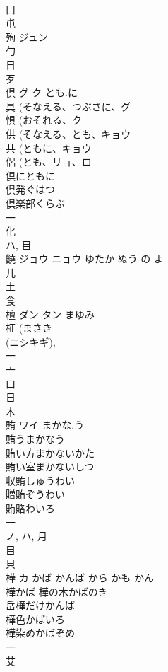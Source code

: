 \documentclass[8pt]{extreport}
\begin{document}
\begin{CJK}{UTF8}{min}
\\	凵 
\\	屯 
\\	殉	ジュン		
\\	勹 
\\	日 
\\	歹 
\\	倶	グ ク	とも.に	
\\	具 (そなえる、つぶさに、グ 
\\	惧 (おそれる、ク 
\\	供 (そなえる、とも、キョウ 
\\	共 (ともに、キョウ 
\\	侶 (とも、リョ、ロ 
\\	倶にともに
\\	倶発ぐはつ
\\	倶楽部くらぶ
\\	一 
\\	化 
\\	ハ, 目 
\\	饒	ジョウ ニョウ	ゆたか ぬう の よ	
\\	儿 
\\	土 
\\	食 
\\	檀	ダン タン	まゆみ	
\\	柾 (まさき 
\\	(ニシキギ), 
\\	一 
\\	亠 
\\	口 
\\	日 
\\	木 
\\	賄	ワイ	まかな.う	
\\	賄うまかなう 
\\	賄い方まかないかた 
\\	賄い室まかないしつ 
\\	収賄しゅうわい 
\\	贈賄ぞうわい 
\\	賄賂わいろ 
\\	一 
\\	ノ, ハ, 月 
\\	目 
\\	貝 
\\	樺	カ	かば かんば から かも かん	
\\	樺かば 樺の木かばのき 
\\	岳樺だけかんば 
\\	樺色かばいろ 
\\	樺染めかばぞめ 
\\	一 
\\	艾 

\end{CJK}
\end{document}
